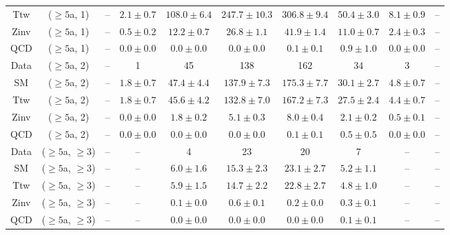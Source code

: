 \begin{table}[h!]
{\begin{tabular}{cccccccccc}
	Ttw & ($\ge5$a, 1) & -- & $2.1\pm 0.7$ & $108.0\pm 6.4$ & $247.7\pm 10.3$ & $306.8\pm 9.4$ & $50.4\pm 3.0$ & $8.1\pm 0.9$ & -- \\[0.5ex] 
	Zinv & ($\ge5$a, 1) & -- & $0.5\pm 0.2$ & $12.2\pm 0.7$ & $26.8\pm 1.1$ & $41.9\pm 1.4$ & $11.0\pm 0.7$ & $2.4\pm 0.3$ & -- \\[0.5ex] 
	QCD & ($\ge5$a, 1) & -- & $0.0\pm 0.0$ & $0.0\pm 0.0$ & $0.0\pm 0.0$ & $0.1\pm 0.1$ & $0.9\pm 1.0$ & $0.0\pm 0.0$ & -- \\[0.5ex] 
	Data & ($\ge5$a, 2) & -- & 1 & 45 & 138 & 162 & 34 & 3 & -- \\[0.5ex] 
	SM & ($\ge5$a, 2) & -- & $1.8\pm 0.7$ & $47.4\pm 4.4$ & $137.9\pm 7.3$ & $175.3\pm 7.7$ & $30.1\pm 2.7$ & $4.8\pm 0.7$ & -- \\[0.5ex] 
	Ttw & ($\ge5$a, 2) & -- & $1.8\pm 0.7$ & $45.6\pm 4.2$ & $132.8\pm 7.0$ & $167.2\pm 7.3$ & $27.5\pm 2.4$ & $4.4\pm 0.7$ & -- \\[0.5ex] 
	Zinv & ($\ge5$a, 2) & -- & $0.0\pm 0.0$ & $1.8\pm 0.2$ & $5.1\pm 0.3$ & $8.0\pm 0.4$ & $2.1\pm 0.2$ & $0.5\pm 0.1$ & -- \\[0.5ex] 
	QCD & ($\ge5$a, 2) & -- & $0.0\pm 0.0$ & $0.0\pm 0.0$ & $0.0\pm 0.0$ & $0.1\pm 0.1$ & $0.5\pm 0.5$ & $0.0\pm 0.0$ & -- \\[0.5ex] 
	Data & ($\ge5$a, $\ge3$) & -- & -- & 4 & 23 & 20 & 7 & -- & -- \\[0.5ex] 
	SM & ($\ge5$a, $\ge3$) & -- & -- & $6.0\pm 1.6$ & $15.3\pm 2.3$ & $23.1\pm 2.7$ & $5.2\pm 1.1$ & -- & -- \\[0.5ex] 
	Ttw & ($\ge5$a, $\ge3$) & -- & -- & $5.9\pm 1.5$ & $14.7\pm 2.2$ & $22.8\pm 2.7$ & $4.8\pm 1.0$ & -- & -- \\[0.5ex] 
	Zinv & ($\ge5$a, $\ge3$) & -- & -- & $0.1\pm 0.0$ & $0.6\pm 0.1$ & $0.2\pm 0.0$ & $0.3\pm 0.1$ & -- & -- \\[0.5ex] 
	QCD & ($\ge5$a, $\ge3$) & -- & -- & $0.0\pm 0.0$ & $0.0\pm 0.0$ & $0.0\pm 0.0$ & $0.1\pm 0.1$ & -- & -- \\[0.5ex] 
	\hline
	\hline
\end{tabular}}
\end{table}
